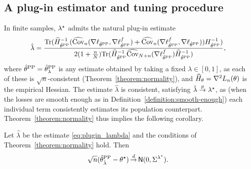 \subsection{A plug-in estimator and tuning procedure}

In finite samples, $\lambda^\star$ admits the natural
plug-in estimate
\begin{equation}
\label{eq:plugin_lambda}
\hat \lambda = \frac{\mathrm{Tr}(\widehat H_{\hat{\theta}^{\mathrm{PP}}}^{-1}( \widehat {\mathrm{Cov}}_n(\nabla \ell_{\hat{\theta}^{\mathrm{PP}}}, \nabla \ell_{\hat{\theta}^{\mathrm{PP}}}^f ) + \widehat {\mathrm{Cov}}_n(\nabla \ell_{\hat{\theta}^{\mathrm{PP}}}^f, \nabla \ell_{\hat{\theta}^{\mathrm{PP}}} ) ) H_{\hat{\theta}^{\mathrm{PP}}}^{-1} )}{2(1+\frac n N) \mathrm{Tr}( \widehat H_{\hat{\theta}^{\mathrm{PP}}}^{-1}\widehat{\mathrm{Cov}}_{N+n}(\nabla \ell_{\hat{\theta}^{\mathrm{PP}}}^f) \widehat H_{\hat{\theta}^{\mathrm{PP}}}^{-1} ) },
\end{equation}
where $\hat{\theta}^{\mathrm{PP}} = \hat{\theta}^{\mathrm{PP}}_\lambda$ is any estimate obtained by taking a
fixed $\lambda \in [0, 1]$, as each of these is $\sqrt{n}$-consistent
(Theorem~\ref{theorem:normality}), and $\widehat{H}_\theta = \nabla^2
L_n(\theta)$ is the empirical Hessian. The estimate $\hat\lambda$ is
consistent, satisfying
$\hat\lambda \stackrel{p}{\rightarrow} \lambda^\star$, as (when the losses are smooth
enough as in Definition~\ref{definition:smooth-enough}) each individual term
consistently estimates its population counterpart.
Theorem~\ref{theorem:normality} thus implies the following corollary.
\begin{corollary}
  \label{cor:clt_w_lambdahat}
  Let $\hat\lambda$ be the estimate \eqref{eq:plugin_lambda} and
  the conditions of Theorem~\ref{theorem:normality} hold. Then
\[\sqrt{n}(\hat{\theta}^{\mathrm{PP}}_{\hat\lambda}- \theta^\star)\mathop{\stackrel{d}{\rightarrow}} \mathsf{N}(0,\Sigma^{\lambda^\star}).\]
\end{corollary}

